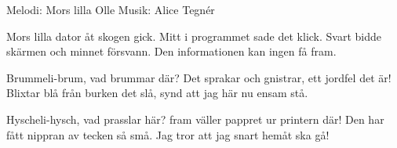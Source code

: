 \begin{song}

\begin{songmeta}
Melodi: Mors lilla Olle
Musik: Alice Tegnér
\end{songmeta}

\begin{songtext}
Mors lilla dator åt skogen gick.
Mitt i programmet sade det klick.
Svart bidde skärmen och minnet försvann.
Den informationen kan ingen få fram.

Brummeli-brum, vad brummar där?
Det sprakar och gnistrar, ett jordfel det är!
Blixtar blå från burken det slå,
synd att jag här nu ensam stå.

Hyscheli-hysch, vad prasslar här?
fram väller pappret ur printern där!
Den har fått nippran av tecken så små.
Jag tror att jag snart hemåt ska gå!
\end{songtext}
\end{song}
